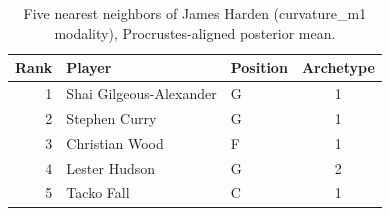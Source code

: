 \begin{table}[htbp]
  \centering\small
  \begin{tabular}{rllc}
    \toprule
    Rank & Player & Position & Archetype \\
    \midrule
    1 & Shai Gilgeous-Alexander & G & 1 \\
    2 & Stephen Curry & G & 1 \\
    3 & Christian Wood & F & 1 \\
    4 & Lester Hudson & G & 2 \\
    5 & Tacko Fall & C & 1 \\
    \bottomrule
  \end{tabular}
  \caption{Five nearest neighbors of James Harden (curvature_m1 modality), Procrustes-aligned posterior mean.}
  \label{tab:James_Harden_neighbors_curvature_m1}
\end{table}

